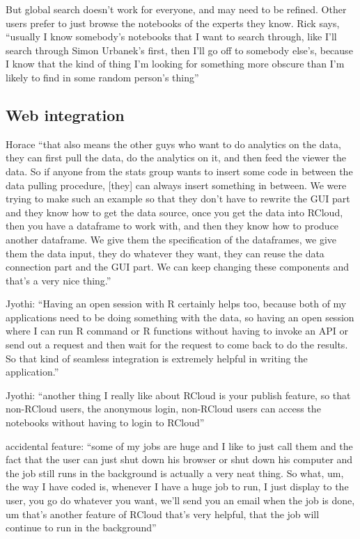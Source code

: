 But global search doesn't work for everyone, and may need to be refined. Other users
prefer to just browse the notebooks of the experts they know. Rick says, ``usually I
know somebody’s notebooks that I want to search through, like I’ll search
through Simon Urbanek’s first, then I’ll go off to somebody else’s, because I
know that the kind of thing I’m looking for something more obscure than I’m
likely to find in some random person’s thing''


\subsection{Web integration}
Horace ``that also means the other guys who want to do analytics on the data,
they can first pull the data, do the analytics on it, and then feed the viewer
the data. So if anyone from the stats group wants to insert some code in between
the data pulling procedure, [they] can always insert something in between. We
were trying to make such an example so that they don't have to rewrite the GUI
part and they know how to get the data source, once you get the data into
RCloud, then you have a dataframe to work with, and then they know how to
produce another dataframe. We give them the specification of the dataframes, we
give them the data input, they do whatever they want, they can reuse the data
connection part and the GUI part. We can keep changing these components and
that's a very nice thing.''

Jyothi: ``Having an open session with R certainly helps too, because both of my
applications need to be doing something with the data, so having an open session
where I can run R command or R functions without having to invoke an API or send
out a request and then wait for the request to come back to do the results.  So
that kind of seamless integration is extremely helpful in writing the
application.''

Jyothi: ``another thing I really like about RCloud is your publish feature, so
that non-RCloud users, the anonymous login, non-RCloud users can access the
notebooks without having to login to RCloud''

accidental feature: ``some of my jobs are huge and I like to just call them and
the fact that the user can just shut down his browser or shut down his computer
and the job still runs in the background is actually a very neat thing. So what,
um, the way I have coded is, whenever I have a huge job to run, I just display
to the user, you go do whatever you want, we'll send you an email when the job
is done, um that's another feature of RCloud that's very helpful, that the job
will continue to run in the background''


